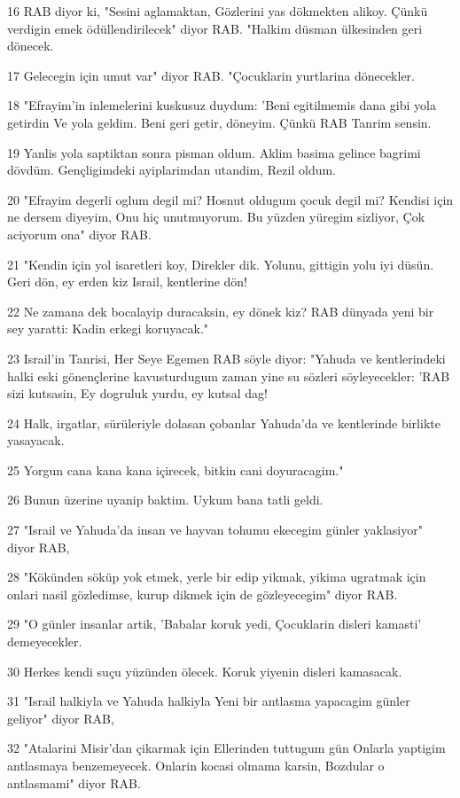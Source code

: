 \par 16 RAB diyor ki, "Sesini aglamaktan, Gözlerini yas dökmekten alikoy. Çünkü verdigin emek ödüllendirilecek" diyor RAB. "Halkim düsman ülkesinden geri dönecek.
\par 17 Gelecegin için umut var" diyor RAB. "Çocuklarin yurtlarina dönecekler.
\par 18 "Efrayim'in inlemelerini kuskusuz duydum: 'Beni egitilmemis dana gibi yola getirdin Ve yola geldim. Beni geri getir, döneyim. Çünkü RAB Tanrim sensin.
\par 19 Yanlis yola saptiktan sonra pisman oldum. Aklim basima gelince bagrimi dövdüm. Gençligimdeki ayiplarimdan utandim, Rezil oldum.
\par 20 "Efrayim degerli oglum degil mi? Hosnut oldugum çocuk degil mi? Kendisi için ne dersem diyeyim, Onu hiç unutmuyorum. Bu yüzden yüregim sizliyor, Çok aciyorum ona" diyor RAB.
\par 21 "Kendin için yol isaretleri koy, Direkler dik. Yolunu, gittigin yolu iyi düsün. Geri dön, ey erden kiz Israil, kentlerine dön!
\par 22 Ne zamana dek bocalayip duracaksin, ey dönek kiz? RAB dünyada yeni bir sey yaratti: Kadin erkegi koruyacak."
\par 23 Israil'in Tanrisi, Her Seye Egemen RAB söyle diyor: "Yahuda ve kentlerindeki halki eski gönençlerine kavusturdugum zaman yine su sözleri söyleyecekler: 'RAB sizi kutsasin, Ey dogruluk yurdu, ey kutsal dag!
\par 24 Halk, irgatlar, sürüleriyle dolasan çobanlar Yahuda'da ve kentlerinde birlikte yasayacak.
\par 25 Yorgun cana kana kana içirecek, bitkin cani doyuracagim."
\par 26 Bunun üzerine uyanip baktim. Uykum bana tatli geldi.
\par 27 "Israil ve Yahuda'da insan ve hayvan tohumu ekecegim günler yaklasiyor" diyor RAB,
\par 28 "Kökünden söküp yok etmek, yerle bir edip yikmak, yikima ugratmak için onlari nasil gözledimse, kurup dikmek için de gözleyecegim" diyor RAB.
\par 29 "O günler insanlar artik, 'Babalar koruk yedi, Çocuklarin disleri kamasti' demeyecekler.
\par 30 Herkes kendi suçu yüzünden ölecek. Koruk yiyenin disleri kamasacak.
\par 31 "Israil halkiyla ve Yahuda halkiyla Yeni bir antlasma yapacagim günler geliyor" diyor RAB,
\par 32 "Atalarini Misir'dan çikarmak için Ellerinden tuttugum gün Onlarla yaptigim antlasmaya benzemeyecek. Onlarin kocasi olmama karsin, Bozdular o antlasmami" diyor RAB.
